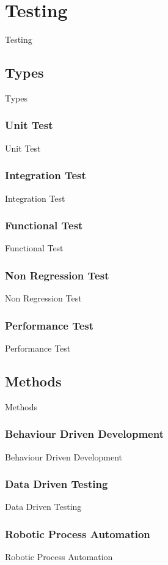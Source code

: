 \section{Testing}\label{sec:testing}
Testing


\subsection{Types}\label{subsec:types}
Types

\subsubsection{Unit Test}
Unit Test

\subsubsection{Integration Test}
Integration Test

\subsubsection{Functional Test}
Functional Test

\subsubsection{Non Regression Test}
Non Regression Test

\subsubsection{Performance Test}
Performance Test


\subsection{Methods}\label{subsec:methods}
Methods

\subsubsection{Behaviour Driven Development}
Behaviour Driven Development

\subsubsection{Data Driven Testing}
Data Driven Testing

\subsubsection{Robotic Process Automation}
Robotic Process Automation


